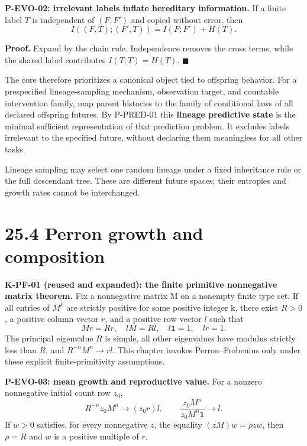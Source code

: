 \documentclass[
  english,
  11pt,
  oneside]{book}
\newcounter{none} %
\begin{document}
\hypertarget{p-evo-02}{}\label{p-evo-02}

\textbf{P-EVO-02: irrelevant labels inflate hereditary information.} If a finite label \(T\) is independent of \((F,F')\) and copied without error, then \[I((F,T);(F',T))=I(F;F')+H(T).\]

\textbf{Proof.} Expand by the chain rule. Independence removes the cross terms, while the shared label contributes \(I(T;T)=H(T)\). \(\blacksquare\)

The core therefore prioritizes a canonical object tied to offspring behavior. For a prespecified lineage-sampling mechanism, observation target, and countable intervention family, map parent histories to the family of conditional laws of all declared offspring futures. By P-PRED-01 this \textbf{lineage predictive state} is the minimal sufficient representation of that prediction problem. It excludes labels irrelevant to the specified future, without declaring them meaningless for all other tasks.

Lineage sampling may select one random lineage under a fixed inheritance rule or the full descendant tree. These are different future spaces; their entropies and growth rates cannot be interchanged.

\section{25.4 Perron growth and composition}\label{perron-growth-and-composition}

\textbf{K-PF-01 (reused and expanded): the finite primitive nonnegative matrix theorem.} Fix a nonnegative matrix M on a nonempty finite type set. If all entries of \(M^k\) are strictly positive for some positive integer k, there exist \(R>0\), a positive column vector \(r\), and a positive row vector \(l\) such that \[Mr=Rr,\quad lM=Rl,\quad l\mathbf1=1,\quad lr=1.\] The principal eigenvalue \(R\) is simple, all other eigenvalues have modulus strictly less than \(R\), and \(R^{-n}M^n\to rl\). This chapter invokes Perron--Frobenius only under these explicit finite-primitivity assumptions.

\hypertarget{p-evo-03}{}\label{p-evo-03}

\textbf{P-EVO-03: mean growth and reproductive value.} For a nonzero nonnegative initial count row \(z_0\), \[R^{-n}z_0M^n\to(z_0r)l,\qquad
\frac{z_0M^n}{z_0M^n\mathbf1}\to l.\] If \(w>0\) satisfies, for every nonnegative \(z\), the equality \((zM)w=\rho zw\), then \(\rho=R\) and \(w\) is a positive multiple of \(r\).
\end{document}
